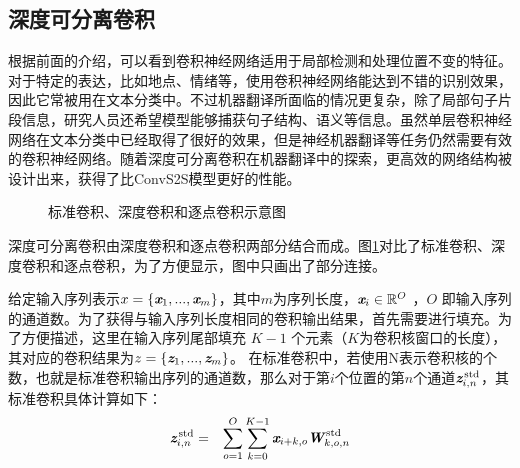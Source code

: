 
\subsection{深度可分离卷积}
\label{sec:11.3.1}

\parinterval 根据前面的介绍，可以看到卷积神经网络适用于局部检测和处理位置不变的特征。对于特定的表达，比如地点、情绪等，使用卷积神经网络能达到不错的识别效果，因此它常被用在文本分类中。不过机器翻译所面临的情况更复杂，除了局部句子片段信息，研究人员还希望模型能够捕获句子结构、语义等信息。虽然单层卷积神经网络在文本分类中已经取得了很好的效果，但是神经机器翻译等任务仍然需要有效的卷积神经网络。随着深度可分离卷积在机器翻译中的探索，更高效的网络结构被设计出来，获得了比ConvS2S模型更好的性能。

\begin{figure}[htp]
\centering

\caption{标准卷积、深度卷积和逐点卷积示意图}
\label{fig:11-17}
\end{figure}

\parinterval 深度可分离卷积由深度卷积和逐点卷积两部分结合而成。图\ref{fig:11-17}对比了标准卷积、深度卷积和逐点卷积，为了方便显示，图中只画出了部分连接。

\parinterval 给定输入序列表示${x} = \{ \textbf{\em x}_1,...,\textbf{\em x}_m \}$，其中$m$为序列长度，$\textbf{\em x}_i \in \mathbb{R}^{O} $ ，$O$ 即输入序列的通道数。为了获得与输入序列长度相同的卷积输出结果，首先需要进行填充。为了方便描述，这里在输入序列尾部填充 $K-1$ 个元素（$K$为卷积核窗口的长度），其对应的卷积结果为${z} = \{ \textbf{\em z}_1,...,\textbf{\em z}_m \}$。
在标准卷积中，若使用N表示卷积核的个数，也就是标准卷积输出序列的通道数，那么对于第$i$个位置的第$n$个通道$ \textbf{\em z}_{i,n}^\textrm{\,std}$，其标准卷积具体计算如下：
\begin{eqnarray}
\textbf{\em z}_{i,n}^\textrm{\,std} &=& \sum_{o=1}^{O} \sum_{k=0}^{K-1} \textbf{\em x}_{i+k,o} \textbf{\em W}_{k,o,n}^\textrm{\,std} 
\label{eq:11-18}
\end{eqnarray}


